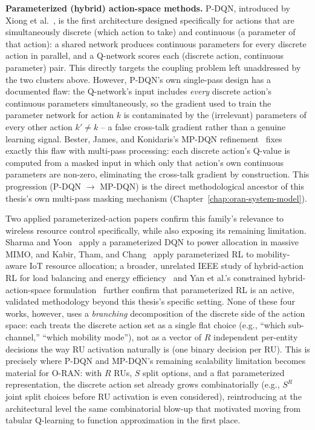 \textbf{Parameterized (hybrid) action-space methods.} P-DQN, introduced by
Xiong et al.~\cite{xiong2018pdqn}, is the first architecture designed
specifically for actions that are simultaneously discrete (which action to
take) and continuous (a parameter of that action): a shared network
produces continuous parameters for every discrete action in parallel, and a
Q-network scores each (discrete action, continuous parameter) pair. This
directly targets the coupling problem left unaddressed by the two clusters
above. However, P-DQN's own single-pass design has a documented flaw: the
Q-network's input includes \emph{every} discrete action's continuous
parameters simultaneously, so the gradient used to train the parameter
network for action $k$ is contaminated by the (irrelevant) parameters of
every other action $k' \neq k$ -- a false cross-talk gradient rather than a
genuine learning signal. Bester, James, and Konidaris's MP-DQN
refinement~\cite{bester2019mpdqn} fixes exactly this flaw with multi-pass
processing: each discrete action's Q-value is computed from a masked input
in which only that action's own continuous parameters are non-zero,
eliminating the cross-talk gradient by construction. This progression
(P-DQN $\to$ MP-DQN) is the direct methodological ancestor of this thesis's
own multi-pass masking mechanism (Chapter~\ref{chap:oran-system-model}).

Two applied parameterized-action papers confirm this family's relevance to
wireless resource control specifically, while also exposing its remaining
limitation. Sharma and Yoon~\cite{sharma2023massivemimo} apply a
parameterized DQN to power allocation in massive MIMO, and Kabir, Tham, and
Chang~\cite{kabir2023mobility} apply parameterized RL to mobility-aware IoT
resource allocation; a broader, unrelated IEEE study of hybrid-action RL
for load balancing and energy efficiency~\cite{ieee2024selfoptimized} and
Yan et al.'s constrained hybrid-action-space
formulation~\cite{yan2025fluctuates} further confirm that parameterized RL
is an active, validated methodology beyond this thesis's specific setting.
None of these four works, however, uses a \emph{branching} decomposition of
the discrete side of the action space: each treats the discrete action set
as a single flat choice (e.g., ``which sub-channel,'' ``which mobility
mode''), not as a vector of $R$ independent per-entity decisions the way RU
activation naturally is (one binary decision per RU). This is precisely
where P-DQN and MP-DQN's remaining scalability limitation becomes material
for O-RAN: with $R$ RUs, $S$ split options, and a flat parameterized
representation, the discrete action set already grows combinatorially
(e.g., $S^R$ joint split choices before RU activation is even considered),
reintroducing at the architectural level the same combinatorial blow-up
that motivated moving from tabular Q-learning to function approximation in
the first place.

